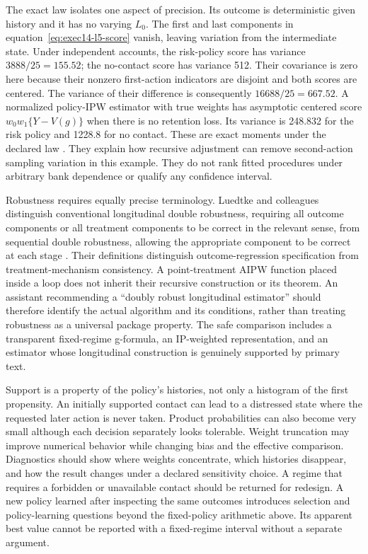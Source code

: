The exact law isolates one aspect of precision. Its outcome is deterministic
given history and it has no varying $L_0$. The first and last components in
equation~\eqref{eq:exec14-l5-score} vanish, leaving variation from the intermediate
state. Under independent accounts, the risk-policy score has variance
$3888/25=155.52$; the no-contact score has variance 512. Their covariance is
zero here because their nonzero first-action indicators are disjoint and both
scores are centered. The variance of their difference is consequently
$16688/25=667.52$. A normalized policy-IPW estimator with true weights has
asymptotic centered score $w_0w_1\{Y-V(g)\}$ when there is no retention loss.
Its variance is 248.832 for the risk policy and 1228.8 for no contact.
These are exact moments under the declared law
\cite{exec14_workflow_oracle}. They explain how recursive adjustment can remove
second-action sampling variation in this example. They do not rank fitted
procedures under arbitrary bank dependence or qualify any confidence interval.

Robustness requires equally precise terminology. Luedtke and colleagues
distinguish conventional longitudinal double robustness, requiring all outcome
components or all treatment components to be correct in the relevant sense,
from sequential double robustness, allowing the appropriate component to be
correct at each stage \cite{sequentialdr2018}. Their definitions distinguish
outcome-regression specification from treatment-mechanism consistency. A
point-treatment AIPW function placed inside a loop does not inherit their
recursive construction or its theorem. An assistant recommending a
``doubly robust longitudinal estimator'' should therefore identify the actual
algorithm and its conditions, rather than treating robustness as a universal
package property. The safe comparison includes a transparent fixed-regime
g-formula, an IP-weighted representation, and an estimator whose longitudinal
construction is genuinely supported by primary text.

Support is a property of the policy's histories, not only a histogram of the
first propensity. An initially supported contact can lead to a distressed
state where the requested later action is never taken. Product probabilities
can also become very small although each decision separately looks tolerable.
Weight truncation may improve numerical behavior while changing bias and the
effective comparison. Diagnostics should show where weights concentrate,
which histories disappear, and how the result changes under a declared
sensitivity choice. A regime that requires a forbidden or unavailable contact
should be returned for redesign. A new policy learned after inspecting the
same outcomes introduces selection and policy-learning questions beyond the
fixed-policy arithmetic above. Its apparent best value cannot be reported
with a fixed-regime interval without a separate argument.

